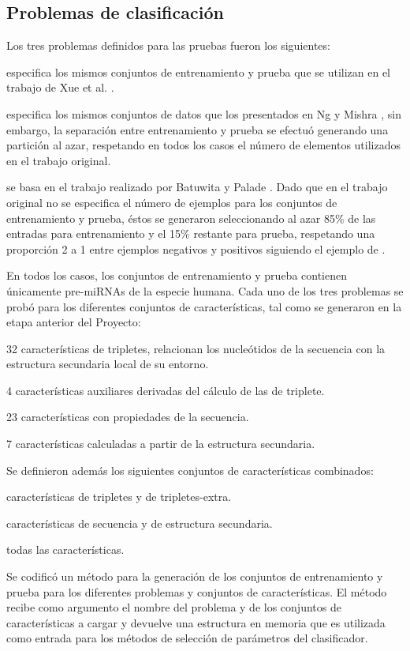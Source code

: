 \documentclass[12pt,bibliography=oldstyle,DIV=12,parskip=half-,titlepage]{scrartcl}
\begin{document}
\subsection{Problemas de clasificación}
%
Los tres problemas definidos para las pruebas fueron los siguientes:
\begin{description}
  [style=sameline,leftmargin=7.5em,itemsep=6pt,align=right]
\item[xue]
  especifica los mismos conjuntos de entrenamiento y prueba
  que se utilizan en el trabajo de Xue et al. \cite{xue}.
\item[ng]
  especifica los mismos conjuntos de datos que los presentados en Ng y Mishra
  \cite{ng}, sin embargo, la separación entre entrenamiento y
  prueba se efectuó generando una partición al azar, respetando en
  todos los casos el número de elementos utilizados en el trabajo
  original.
\item[batuwita]
  se basa en el trabajo realizado por Batuwita y Palade
  \cite{batuwita}. Dado que en el trabajo original no se especifica el
  número de ejemplos para los conjuntos de entrenamiento y prueba,
  éstos se generaron seleccionando al azar 85\% de las entradas para
  entrenamiento y el 15\% restante para prueba, respetando una
  proporción 2 a 1 entre ejemplos negativos y positivos siguiendo
  el ejemplo de \cite{ng}.
\end{description}
En todos los casos, los conjuntos de entrenamiento y prueba contienen
únicamente pre-miRNAs de la especie humana.
Cada uno de los tres problemas se probó para los diferentes conjuntos
de características, tal como se generaron en la etapa anterior del
Proyecto:
\begin{description}
  [style=sameline,leftmargin=7.5em,itemsep=6pt,align=right]
\item[Triplete (T)] 32 características de tripletes, relacionan los
  nucleótidos de la secuencia con la estructura secundaria local de su
  entorno.
\item[Triplete-extra (X)] 4 características auxiliares derivadas del
  cálculo de las de triplete.
\item[Secuencia (S)] 23 características con propiedades de la
  secuencia.
\item[Estructura (E)] 7 características calculadas a partir de la
  estructura secundaria.
\end{description}
Se definieron además los siguientes conjuntos de características combinados:
\begin{description}
  [style=sameline,leftmargin=7.5em,itemsep=6pt,align=right]
\item[T-X] características de tripletes y de tripletes-extra.
\item[S-E] características de secuencia y de estructura secundaria.
\item[T-X-S-E] todas las características.
\end{description}
%
Se codificó un método para la generación de los conjuntos de
entrenamiento y prueba para los diferentes problemas y conjuntos de
características.  El método recibe como argumento el nombre del
problema y de los conjuntos de características a cargar y devuelve una
estructura en memoria que es utilizada como entrada para los métodos
de selección de parámetros del clasificador.
%
\end{document}
